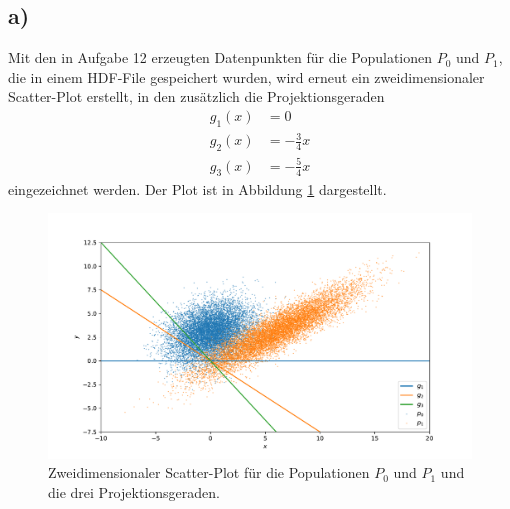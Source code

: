 \documentclass[a4paper, 11pt]{article}
\begin{document}
\subsection*{a)}
Mit den in Aufgabe 12 erzeugten Datenpunkten für die Populationen $P_0$ und $P_1$,
die in einem HDF-File gespeichert wurden, wird erneut ein zweidimensionaler
Scatter-Plot erstellt, in den zusätzlich die Projektionsgeraden
\begin{align*}
  g_1(x)&=0 \\
  g_2(x)&=-\frac{3}{4}x\\
  g_3(x)&=-\frac{5}{4}x
\end{align*}
eingezeichnet werden. Der Plot ist in Abbildung \ref{fig:populationen+geraden}
dargestellt.
\begin{figure}
  \centering
  \includegraphics[width=\textwidth]{../A13/A13a_scatter}
  \caption{Zweidimensionaler Scatter-Plot für die Populationen $P_0$ und $P_1$
  und die drei Projektionsgeraden.}
  \label{fig:populationen+geraden}
\end{figure}
\end{document}
